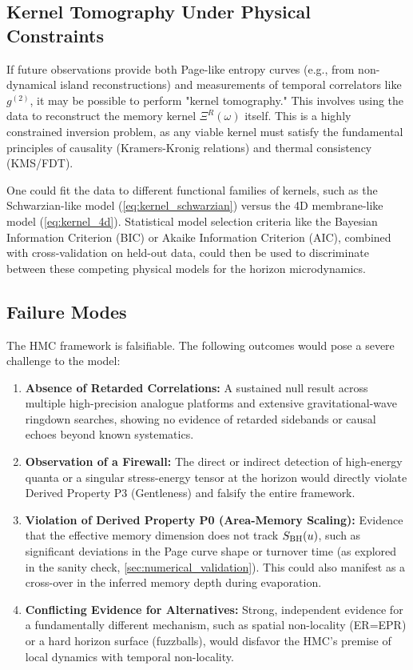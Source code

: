 \documentclass[a4paper,11pt]{article}
\newcommand{\eg}{e.g.\xspace}
\newcommand{\HMC}{\textup{\textsc{HMC}}\xspace}
\theoremstyle{plain}
\theoremstyle{definition}
\theoremstyle{remark}
\begin{document}
\subsection{Kernel Tomography Under Physical Constraints}
If future observations provide both Page-like entropy curves (\eg, from non-dynamical island reconstructions) and measurements of temporal correlators like $g^{(2)}$, it may be possible to perform "kernel tomography." This involves using the data to reconstruct the memory kernel $\Xi^R(\omega)$ itself. This is a highly constrained inversion problem, as any viable kernel must satisfy the fundamental principles of causality (Kramers-Kronig relations) and thermal consistency (KMS/FDT).

One could fit the data to different functional families of kernels, such as the Schwarzian-like model (\eqref{eq:kernel_schwarzian}) versus the 4D membrane-like model (\eqref{eq:kernel_4d}). Statistical model selection criteria like the Bayesian Information Criterion (BIC) or Akaike Information Criterion (AIC), combined with cross-validation on held-out data, could then be used to discriminate between these competing physical models for the horizon microdynamics.

\subsection{Failure Modes}
The \HMC{} framework is falsifiable. The following outcomes would pose a severe challenge to the model:
\begin{enumerate}
    \item \textbf{Absence of Retarded Correlations:} A sustained null result across multiple high-precision analogue platforms and extensive gravitational-wave ringdown searches, showing no evidence of retarded sidebands or causal echoes beyond known systematics.
    \item \textbf{Observation of a Firewall:} The direct or indirect detection of high-energy quanta or a singular stress-energy tensor at the horizon would directly violate Derived Property P3 (Gentleness) and falsify the entire framework.
    \item \textbf{Violation of Derived Property P0 (Area-Memory Scaling):} Evidence that the effective memory dimension does not track $S_{\rm BH}(u)$, such as significant deviations in the Page curve shape or turnover time (as explored in the sanity check, \cref{sec:numerical_validation}). This could also manifest as a cross-over in the inferred memory depth during evaporation.
    \item \textbf{Conflicting Evidence for Alternatives:} Strong, independent evidence for a fundamentally different mechanism, such as spatial non-locality (ER=EPR) or a hard horizon surface (fuzzballs), would disfavor the \HMC{}'s premise of local dynamics with temporal non-locality.
\end{enumerate}
\end{document}
